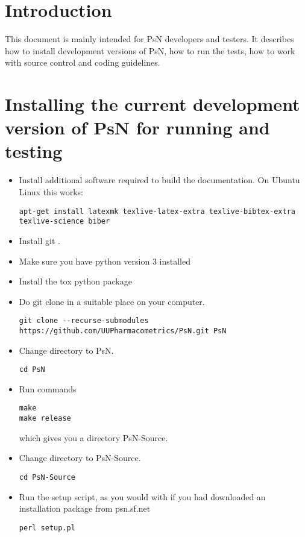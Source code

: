 
\usepackage{hyperref}



\maketitle
\tableofcontents
\newpage


\section{Introduction}

This document is mainly intended for PsN developers and testers. It describes how to install development versions of PsN, how to run the tests, how to work with source control and coding guidelines.

\section{Installing the current development version of PsN for running and testing}
\begin{itemize}
\item Install additional software required to build the documentation.  On Ubuntu Linux this works:
\begin{verbatim}
apt-get install latexmk texlive-latex-extra texlive-bibtex-extra texlive-science biber
\end{verbatim}
\item Install git \cite{git}.
\item Make sure you have python version 3 installed
\item Install the tox python package
\item Do git clone in a suitable place on your computer.
\begin{verbatim}
git clone --recurse-submodules https://github.com/UUPharmacometrics/PsN.git PsN
\end{verbatim}
\item Change directory to PsN.
\begin{verbatim}
cd PsN
\end{verbatim}
\item Run commands
\begin{verbatim}
make
make release
\end{verbatim}
\noindent which gives you a directory PsN-Source.
\item Change directory to PsN-Source.
\begin{verbatim}
cd PsN-Source
\end{verbatim}
\item Run the setup script, as you would with if you had downloaded an installation package from psn.sf.net
\begin{verbatim}
perl setup.pl
\end{verbatim}
\end{itemize}

